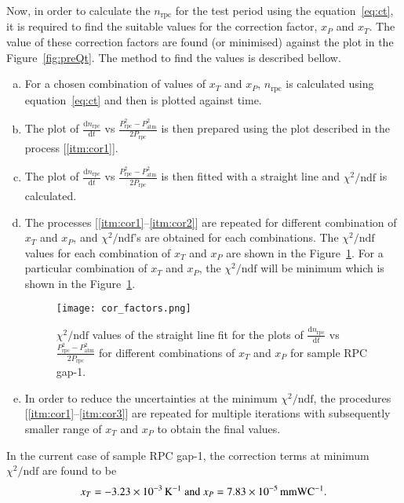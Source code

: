 Now, in order to calculate the $n_{\textrm{rpc}}$ for the test period using the
equation~\ref{eq:ct}, it is required to find the suitable values for the
correction factor, $x_P$ and $x_T$. The value of these correction factors are
found (or minimised) against the plot in the Figure~\ref{fig:preQt}. The method
to find the values is described bellow.
\begin{enumerate}[a.]
\item \label{itm:cor1} For a chosen combination of values of $x_T$ and $x_P$,
  $n_{\textrm{rpc}}$ is calculated using equation~\ref{eq:ct} and then is plotted
  against time.
\item The plot of $\frac{\mathrm{d}n_{\textrm{rpc}}}{\mathrm{d}t}$ vs
  $\frac{P_{\textrm{rpc}}^{2}-P_{\textrm{atm}}^{2}}{2P_{\textrm{rpc}}}$ is then prepared
  using the plot described in the process [\ref{itm:cor1}].
\item \label{itm:cor2} The plot of
  $\frac{\mathrm{d}n_{\textrm{rpc}}}{\mathrm{d}t}$ vs
  $\frac{P_{\textrm{rpc}}^{2}-P_{\textrm{atm}}^{2}}{2P_{\textrm{rpc}}}$ is then fitted
  with a straight line and $\chi^2/\textrm{ndf}$ is calculated.
\item \label{itm:cor3} The processes [\ref{itm:cor1}--\ref{itm:cor2}] are
  repeated for different combination of $x_T$ and $x_P$, and
  $\chi^2/\textrm{ndf}$'s are obtained for each combinations. The
  $\chi^2/\textrm{ndf}$ values for each combination of $x_T$ and $x_P$ are
  shown in the Figure~\ref{fig:xp}. For a particular combination of $x_T$ and
  $x_P$, the $\chi^2/\textrm{ndf}$ will be minimum which is shown in the
  Figure~\ref{fig:xp}.
  \begin{figure}[h]
    \centering
    \texttt{[image: cor\_factors.png]}
    \caption{$\chi^2/\textrm{ndf}$ values of the straight line fit for the
      plots of $\frac{\mathrm{d}n_{\textrm{rpc}}}{\mathrm{d}t}$ vs
      $\frac{P_{\textrm{rpc}}^{2}-P_{\textrm{atm}}^{2}}{2P_{\textrm{rpc}}}$ for different
      combinations of $x_T$ and $x_P$ for sample RPC gap-1.}
    \label{fig:xp}
  \end{figure}
\item In order to reduce the uncertainties at the minimum
  $\chi^2/\textrm{ndf}$, the procedures [\ref{itm:cor1}--\ref{itm:cor3}] are
  repeated for multiple iterations with subsequently smaller range of $x_T$
  and $x_P$ to obtain the final values.
\end{enumerate}

In the current case of sample RPC gap-1, the correction terms at minimum
$\chi^2/\textrm{ndf}$ are found to be
\[x_T=-3.23\times10^{-3}\textrm{\,K}^{-1}\textrm{ and }x_P=7.83\times10^{-5}\textrm{\,mmWC}^{-1}\textrm{.}\]

